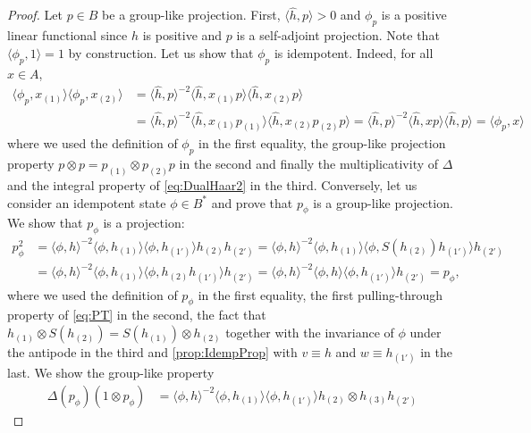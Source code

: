 \documentclass[a4paper,10pt]{amsart}
\newcommand{\eval}[2]{\langle #1 , #2\rangle}
\theoremstyle{definition}
\begin{document}
\begin{proof}
	Let $p\in B$ be a group-like projection. First, $\eval{\hat{h}}{p} > 0$ and $\phi_p$ is a positive linear functional since $\hat{h}$ is positive and $p$ is a self-adjoint projection. Note that $\eval{\phi_p}{1} = 1$ by construction. Let us show that $\phi_p$ is idempotent. Indeed, for all $x\in A$,
	\begin{align*}
        \eval{\phi_p}{x_{(1)}}
            \eval{\phi_p}{x_{(2)}}
        &=
        \eval{\hat{h}}{p}^{-2}
            \eval{\hat{h}}{x_{(1)}p}
                \eval{\hat{h}}{x_{(2)}p}
        \\&
        =
        \eval{\hat{h}}{p}^{-2}
            \eval{\hat{h}}{x_{(1)}p_{(1)}}
                \eval{\hat{h}}{x_{(2)} p_{(2)} p}
        =
        \eval{\hat{h}}{p}^{-2}
            \eval{\hat{h}}{xp}\eval{\hat{h}}{p}
        =
        \eval{\phi_p}{x}
	\end{align*}
    where we used the definition of $\phi_p$ in the first equality, the group-like projection property $p \otimes p = p_{(1)} \otimes p_{(2)}p$ in the second and finally the multiplicativity of $\Delta$ and the integral property of \cref{eq:DualHaar2} in the third.
    \smallbreak\noindent%
    Conversely, let us consider an idempotent state $\phi \in B^*$ and prove that $p_\phi$ is a group-like projection. We show that $p_\phi$ is a projection:
    \begin{align*}
        p_\phi^2
        &=
        \eval{\phi}{h}^{-2}\eval{\phi}{h_{(1)}} \eval{\phi}{h_{(1')}} h_{(2)} h_{(2')}
        =
        \eval{\phi}{h}^{-2}\eval{\phi}{h_{(1)}} \eval{\phi}{S(h_{(2)})h_{(1')}} h_{(2')}\\
        &=
        \eval{\phi}{h}^{-2}\eval{\phi}{h_{(1)}} \eval{\phi}{h_{(2)}h_{(1')}} h_{(2')}
        =
        \eval{\phi}{h}^{-2}\eval{\phi}{h} \eval{\phi}{h_{(1')}} h_{(2')}
        =
        p_\phi,
    \end{align*}
    where we used the definition of $p_\phi$ in the first equality, the first pulling-through property of \cref{eq:PT} in the second, the fact that $h_{(1)} \otimes S(h_{(2)})=S(h_{(1)}) \otimes h_{(2)}$ together with the invariance of $\phi$ under the antipode in the third and \cref{prop:IdempProp} with $v\equiv h$ and $w\equiv h_{(1')}$ in the last.
    \smallbreak\noindent%
    We show the group-like property
    \begin{align*}
    	\Delta(p_\phi)(1\otimes p_\phi)
    	&=
    	\eval{\phi}{h}^{-2} \eval{\phi}{h_{(1)}} \eval{\phi}{h_{(1')}} h_{(2)} \otimes h_{(3)} h_{(2')}

\end{align*}
\end{proof}
\end{document}
